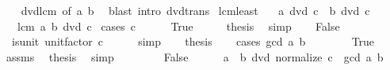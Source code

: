 \begin{isabellebody}
%
\isadelimproof
\ \ %
\endisadelimproof
%
\isatagproof
{}\isamarkupfalse%
\ dvd{\isacharunderscore}{\kern0pt}lcm{}\ {\isacharbrackleft}{\kern0pt}of\ a\ b{\isacharbrackright}{\kern0pt}\ \isamarkupfalse%
\ {\isacharparenleft}{\kern0pt}blast\ intro{\isacharcolon}{\kern0pt}\ dvd{\isacharunderscore}{\kern0pt}trans{\isacharparenright}{\kern0pt}%
\endisatagproof
{\isafoldproof}%
%
\isadelimproof
\isanewline
%
\endisadelimproof
\isanewline
{}\isamarkupfalse%
\ lcm{\isacharunderscore}{\kern0pt}least{\isacharcolon}{\kern0pt}\isanewline
\ \ \ {\isachardoublequoteopen}a\ dvd\ c{\isachardoublequoteclose}\ \ {\isachardoublequoteopen}b\ dvd\ c{\isachardoublequoteclose}\isanewline
\ \ \ {\isachardoublequoteopen}lcm\ a\ b\ dvd\ c{\isachardoublequoteclose}\isanewline
%
\isadelimproof
%
\endisadelimproof
%
\isatagproof
{}\isamarkupfalse%
\ {\isacharparenleft}{\kern0pt}cases\ {\isachardoublequoteopen}c\ {\isacharequal}{\kern0pt}\ {}{\isachardoublequoteclose}{\isacharparenright}{\kern0pt}\isanewline
\ \ \isamarkupfalse%
\ True\isanewline
\ \ \isamarkupfalse%
\ \isamarkupfalse%
\ {\isacharquery}{\kern0pt}thesis\ \isamarkupfalse%
\ simp\isanewline
{}\isamarkupfalse%
\isanewline
\ \ \isamarkupfalse%
\ False\isanewline
\ \ \isamarkupfalse%
\ \isamarkupfalse%
\ {\isacharasterisk}{\kern0pt}{\isacharcolon}{\kern0pt}\ {\isachardoublequoteopen}is{\isacharunderscore}{\kern0pt}unit\ {\isacharparenleft}{\kern0pt}unit{\isacharunderscore}{\kern0pt}factor\ c{\isacharparenright}{\kern0pt}{\isachardoublequoteclose}\isanewline
\ \ \ \ \isamarkupfalse%
\ simp\isanewline
\ \ \isamarkupfalse%
\ {\isacharquery}{\kern0pt}thesis\isanewline
\ \ \isamarkupfalse%
\ {\isacharparenleft}{\kern0pt}cases\ {\isachardoublequoteopen}gcd\ a\ b\ {\isacharequal}{\kern0pt}\ {}{\isachardoublequoteclose}{\isacharparenright}{\kern0pt}\isanewline
\ \ \ \ \isamarkupfalse%
\ True\isanewline
\ \ \ \ \isamarkupfalse%
\ assms\ \isamarkupfalse%
\ {\isacharquery}{\kern0pt}thesis\ \isamarkupfalse%
\ simp\isanewline
\ \ \isamarkupfalse%
\isanewline
\ \ \ \ \isamarkupfalse%
\ False\isanewline
\ \ \ \ \isamarkupfalse%
\ {\isachardoublequoteopen}a\ {\isacharasterisk}{\kern0pt}\ b\ dvd\ normalize\ {\isacharparenleft}{\kern0pt}c\ {\isacharasterisk}{\kern0pt}\ gcd\ a\ b{\isacharparenright}{\kern0pt}{\isachardoublequoteclose}\isanewline

\end{isabellebody}
